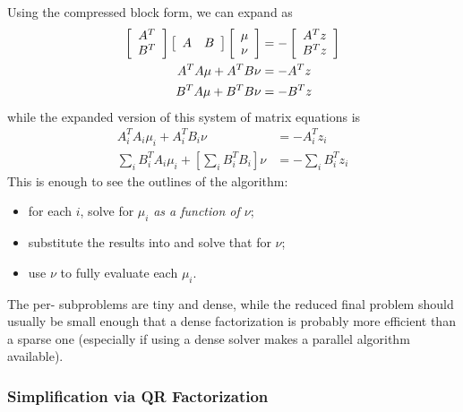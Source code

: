 Using the compressed block form, we can expand  as
\begin{align}
    \left[
        \begin{array}{ c }
            A^T \\
            B^T
        \end{array}
    \right]
    \left[
        \begin{array}{ c c }
            A & B
        \end{array}
    \right]
    \left[
        \begin{array}{ c }
            \mu \\
            \nu
        \end{array}
    \right]
    &=
    -\left[
        \begin{array}{ c }
            A^T z \\
            B^T z
        \end{array}
    \right] \\
    A^T A \mu + A^T B \nu &= -A^T z \\
    B^T A \mu + B^T B \nu &= -B^T z
\end{align}
while the expanded version of this system of matrix equations is
\begin{align}
    A_i^T A_i \mu_i + A_i^T B_i \nu &= -A_i^T z_i \label{eq:vp_star_subproblem} \\
    \sum_i B_i^T A_i \mu_i + \left[\sum_i B_i^T B_i\right]\nu &= -\sum_i B_i^T z_i \label{eq:vp_reduced_problem}
\end{align}
This is enough to see the outlines of the algorithm:
\begin{itemize}
    \item for each  $i$, solve  for $\mu_i$ \emph{as a function of $\nu$};
    \item substitute the results into  and solve that for $\nu$;
    \item use $\nu$ to fully evaluate each $\mu_i$.
\end{itemize}
The per- subproblems are tiny and dense, while the reduced final problem should usually be small enough that a dense factorization is probably more efficient than a sparse one (especially if using a dense solver makes a parallel algorithm available).

\subsubsection{Simplification via QR Factorization}

